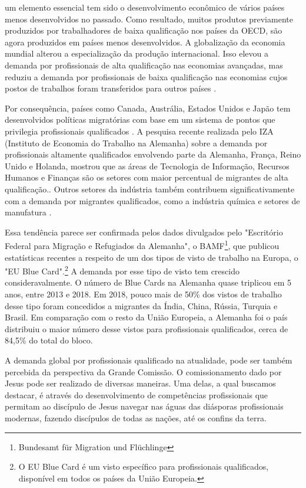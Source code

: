 \documentclass[12pt,openright,oneside,a4paper,
english,french,spanish,brazil]{abntex2}
\begin{document}
\begin{citacao} um elemento essencial tem sido o desenvolvimento econômico de vários países menos desenvolvidos no passado. Como resultado, muitos produtos previamente produzidos por trabalhadores de baixa qualificação nos países da OECD, são agora produzidos em países menos desenvolvidos. A globalização da economia mundial alterou a especialização da produção internacional. Isso elevou a demanda por profissionais de alta qualificação nas economias avançadas, mas reduziu a demanda por profissionais de baixa qualificação nas economias cujos postos de trabalhos foram transferidos para outros países \cite[p. 3]{chiswick_high_2005}. \end{citacao}

Por consequência, países como Canada, Austrália, Estados Unidos e Japão tem desenvolvidos políticas migratórias com base em um sistema de pontos que privilegia profissionais qualificados \cite[p. 6]{chiswick_high_2005}. A pesquisa recente realizada pelo IZA (Instituto de Economia do Trabalho na Alemanha) sobre a demanda por profissionais altamente qualificados envolvendo parte da Alemanha, França, Reino Unido e Holanda, mostrou que as áreas de Tecnologia de Informação, Recursos Humanos e Finanças são os setores com maior percentual de migrantes de alta qualificação.\cite[p. 7]{bauer_demand_2004}. Outros setores da indústria também contribuem significativamente com a demanda por migrantes qualificados, como a indústria química e setores de manufatura \cite[p. 18]{bauer_demand_2004}.

Essa tendência parece ser confirmada pelos dados divulgados pelo "Escritório Federal para Migração e Refugiados da Alemanha", o BAMF\footnote{Bundesamt für Migration und Flüchlinge}, que publicou estatísticas recentes a respeito de um dos tipos de visto de trabalho na Europa, o "EU Blue Card".\footnote{O EU Blue Card é um visto específico para profissionais qualificados, disponível em todos os países da União Europeia.} A demanda por esse tipo de visto tem crescido consideravalmente. O número de Blue Cards na Alemanha quase triplicou em 5 anos, entre 2013 e 2018. Em 2018, pouco mais de 50\% dos vistos de trabalho desse tipo foram concedidos a migrantes da Índia, China, Rússia, Turquia e Brasil. Em comparação com o resto da União Europeia, a Alemanha foi o país distribuiu o maior número desse vistos para profissionais qualificados, cerca de 84,5\% do total do bloco\cite{bamf}.

A demanda global por profissionais qualificado na atualidade, pode ser também percebida da perspectiva da Grande Comissão. O comissionamento dado por Jesus pode ser realizado de diversas maneiras. Uma delas, a qual buscamos destacar, é através do desenvolvimento de competências profissionais que permitam ao discípulo de Jesus navegar nas águas das diásporas profissionais modernas, fazendo discípulos de todas as nações, até os confins da terra.
\end{document}
